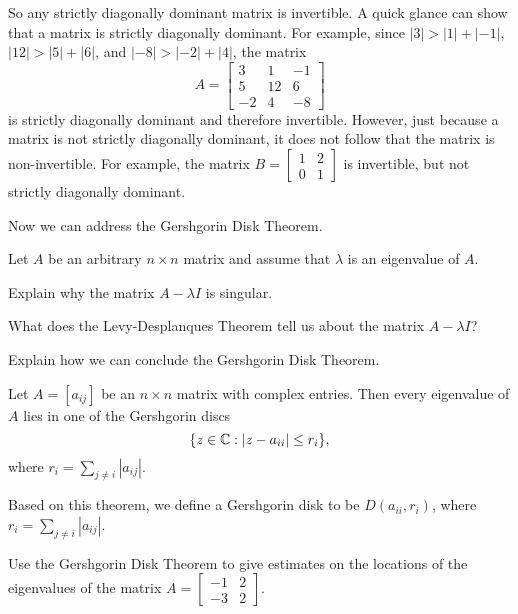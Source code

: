 So any strictly diagonally dominant matrix is invertible. A quick glance can show that a matrix is strictly diagonally dominant. For example, since $|3| > |1| + |-1|$, $|12| > |5| +|6|$, and $|-8| > |-2| + |4|$, the matrix 
\[A = \left[ \begin{array}{rcr} 3&1&-1 \\ 5&12&6 \\ -2&4&-8 \end{array} \right]\]
is strictly diagonally dominant and therefore invertible. However, just because a matrix is not strictly diagonally dominant, it does not follow that the matrix is non-invertible. For example, the matrix $B = \left[ \begin{array}{cc} 1&2 \\ 0&1 \end{array} \right]$ is invertible, but not strictly diagonally dominant.

Now we can address the Gershgorin Disk Theorem. 

\begin{pactivity} \label{act:Gershgorin_2}  Let $A$ be an arbitrary $n \times n$ matrix and assume that $\lambda$ is an eigenvalue of $A$.
	\ba
	\item Explain why the matrix $A - \lambda I$ is singular.

	\item What does the Levy-Desplanques Theorem tell us about the matrix $A - \lambda I$? 

	\item Explain how we can conclude the Gershgorin Disk Theorem.
 
\begin{theorem} \label{thm:Gershgorin} Let $A=[a_{ij}]$ be an $n \times n$ matrix with complex entries. Then every eigenvalue of $A$ lies in one of the Gershgorin discs
\[\{z \in \mathbb{C} : |z-a_{ii}| \leq r_i\},\]
where $r_i = \sum_{j \neq i} |a_{ij}|$.
\end{theorem}

Based on this theorem, we define a Gershgorin disk to be $D(a_{ii}, r_i)$, where $r_i =  \sum_{j \neq i} |a_{ij}|$. 


	\item Use the Gershgorin Disk Theorem to give estimates on the locations of the eigenvalues of the matrix $A = \left[ \begin{array}{rr} -1&2 \\ -3&2 \end{array} \right]$.


	\ea
\end{pactivity} 


